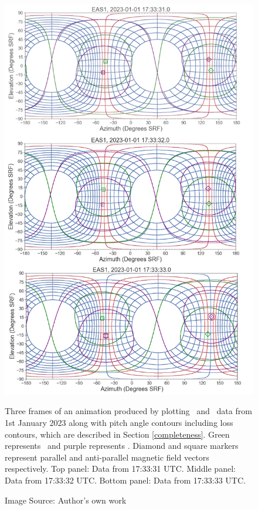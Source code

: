\begin{figure}[h!]
    \centering
    \centerfloat
    \includegraphics[width=0.84\linewidth]{figures/anim_example.png}
    \caption{Three frames of an animation produced by plotting \Beas\ and \Bmag\ data from 1st January 2023 along with pitch angle contours including loss contours, which are described in Section \ref{completeness}. Green represents \Beas\ and purple represents \Bmag. Diamond and square markers represent parallel and anti-parallel magnetic field vectors respectively. Top panel: Data from 17:33:31 UTC. Middle panel: Data from 17:33:32 UTC. Bottom panel: Data from 17:33:33 UTC.}
    \caption*{Image Source: Author's own work}
    \label{fig: animation example}
\end{figure}
\\
\newpage

